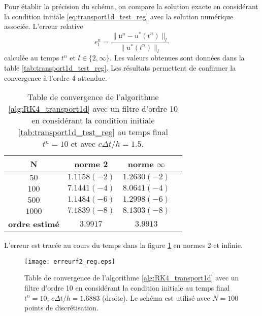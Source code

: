 Pour établir la précision du schéma, on compare la solution exacte en considérant la condition initiale \eqref{eq:transport1d_test_reg} avec la solution numérique associée. L'erreur relative
\begin{equation}
e_l^n = \dfrac{\| \mathfrak{u}^n - u^*(t^n) \|_l}{\| u^*(t^n) \|_l}
\end{equation}
calculée au temps $t^n$ et $l \in \lbrace 2, \infty \rbrace$. Les valeurs obtenues sont données dans la table \ref{tab:transport1d_test_reg}. Les résultats permettent de confirmer la convergence à l'ordre 4 attendue.
\begin{table}[htbp]
\begin{center}
\begin{tabular}{|c||c|c|c|}
\hline
\textbf{N}  & \textbf{norme 2} & \textbf{norme $\infty$} \\
\hline
\hline
$50$   & $1.1158(-2)$  & $1.2630(-2)$  \\
$100$  & $7.1441(-4)$  & $8.0641(-4)$  \\
$500$  & $1.1484(-6)$  & $1.2998(-6)$  \\
$1000$ & $7.1839(-8)$  & $8.1303(-8)$  \\
\hline 
\hline
\textbf{ordre estimé}& $3.9917$ & $3.9913$\\
\hline
\end{tabular}
\end{center}
\caption{Table de convergence de l'algorithme \ref{alg:RK4_transport1d} avec un filtre d'ordre 10 en considérant la condition initiale \eqref{tab:transport1d_test_reg} au temps final $t^n = 10$ et avec $c \Delta t/ h = 1.5$.}
\label{tab:rate_transport1d_test_reg}
\end{table} 
L'erreur est tracée au cours du temps dans la figure \ref{fig:transport1d_test_reg} en normes 2 et infinie.
\begin{figure}[htbp]
\begin{center}
\texttt{[image: erreurf2\_reg.eps]}
\end{center}
\caption{Table de convergence de l'algorithme \ref{alg:RK4_transport1d} avec un filtre d'ordre 10 en considérant la condition initiale \label{tab:transport1d_test_reg} au temps final $t^n = 10$, $c \Delta t/ h = 1.6883$ (droite). Le schéma est utilisé avec $N=100$ points de discrétisation.}
\label{fig:transport1d_test_reg}
\end{figure}

